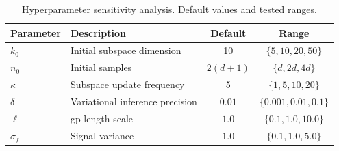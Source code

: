 \begin{table}[htbp]
    \centering
    \caption{Hyperparameter sensitivity analysis.  Default values and tested
    ranges.}
    \label{tab:hyperparameters}
    \begin{tabularx}{\textwidth}{@{}lXcc@{}}
        \toprule
        \textbf{Parameter} & \textbf{Description} & \textbf{Default} &
        \textbf{Range} \\
        \midrule
        $k_0$ & Initial subspace dimension & 10 & $\{5, 10, 20, 50\}$ \\
        $n_0$ & Initial samples & $2(d+1)$ & $\{d, 2d, 4d\}$ \\
        $\kappa$ & Subspace update frequency & 5 & $\{1, 5, 10, 20\}$ \\
        $\delta$ & Variational inference precision & $0.01$ & $\{0.001, 0.01, 0.1\}$ \\
        $\ell$ & \gls{gp} length-scale & $1.0$ & $\{0.1, 1.0, 10.0\}$ \\
        $\sigma_f$ & Signal variance & $1.0$ & $\{0.1, 1.0, 5.0\}$ \\
        \bottomrule
    \end{tabularx}
\end{table}
